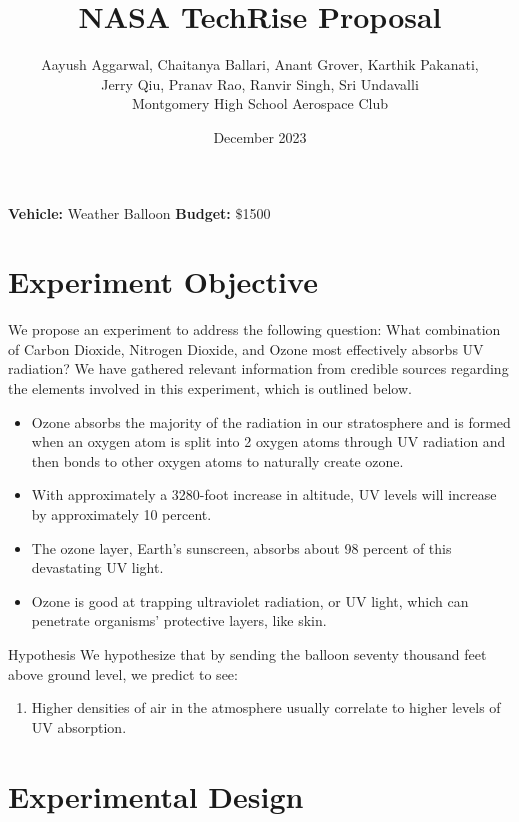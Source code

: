 \documentclass{article}
\title{NASA TechRise Proposal}
\author{Aayush Aggarwal, Chaitanya Ballari, Anant Grover, Karthik Pakanati,\\
        Jerry Qiu, Pranav Rao, Ranvir Singh, Sri Undavalli\\[0.6em]
        Montgomery High School Aerospace Club}
\date{December 2023}
\begin{document}
\maketitle

\begin{center}
\textbf{Vehicle:} Weather Balloon \qquad \textbf{Budget:} $\$$1500
\end{center}

\section{Experiment Objective}

We propose an experiment to address the following question: What combination of Carbon Dioxide, Nitrogen Dioxide, and Ozone most effectively absorbs UV radiation? We have gathered relevant information from credible sources regarding the elements involved in this experiment, which is outlined below.

\begin{itemize}
  \item Ozone absorbs the majority of the radiation in our stratosphere and is formed when an oxygen atom is split into 2 oxygen atoms through UV radiation and then bonds to other oxygen atoms to naturally create ozone.
  \item With approximately a \num{3280}-foot increase in altitude, UV levels will increase by approximately 10 percent.
  \item The ozone layer, Earth's sunscreen, absorbs about 98 percent of this devastating UV light.
  \item Ozone is good at trapping ultraviolet radiation, or UV light, which can penetrate organisms' protective layers, like skin.
\end{itemize}

\begin{keybox}{Hypothesis}
We hypothesize that by sending the balloon seventy thousand feet above ground level, we predict to see:
\begin{enumerate}
  \item Higher densities of air in the atmosphere usually correlate to higher levels of UV absorption.
\end{enumerate}
\end{keybox}

\section{Experimental Design}
\end{document}
